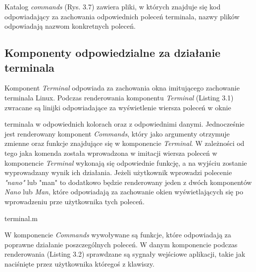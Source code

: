 \documentclass[10pt,a4paper]{report}
\begin{document}
\begin{adjustwidth}{2cm}{2cm}
\begin{adjustwidth}{0cm}{0cm}
\begin{minipage}{\linewidth}
\begin{center}
\end{center}
\end{minipage}
\begin{minipage}{\linewidth}
\vspace{0.3cm}
 Katalog \textit{commands} (Rys. 3.7) zawiera pliki, w których znajduje się kod odpowiadający za zachowania odpowiednich poleceń terminala, nazwy plików odpowiadają nazwom konkretnych poleceń.
 \end{minipage}
\end{adjustwidth}
\subsection{Komponenty odpowiedzialne za działanie terminala}
\begin{minipage}{1\linewidth}
Komponent \textit{Terminal} odpowiada za zachowania okna imitującego zachowanie terminala Linux. Podczas renderowania komponentu \textit{Terminal} (Listing 3.1) zwracane są linijki odpowiadające za wyświetlenie wiersza poleceń w oknie 
\end{minipage}
\begin{minipage}{1\linewidth}
terminala w odpowiednich kolorach oraz z odpowiednimi danymi. Jednocześnie jest renderowany komponent \textit{Commands}, który jako argumenty otrzymuje zmienne oraz funkcje znajdujące się w komponencie \textit{Terminal}. W zależności od  tego jaka komenda została wprowadzona w imitacji  wiersza poleceń w komponencie \textit{Terminal} wykonają się odpowiednie funkcję, a na wyjściu zostanie wyprowadzany wynik ich działania. Jeżeli użytkownik wprowadzi polecenie \textit{"nano"} lub "man" to dodatkowo będzie renderowany jeden z dwóch komponentów \textit{Nano} lub \textit{Man}, które odpowiadają za zachowanie okien wyświetlających się po wprowadzeniu prze użytkownika tych poleceń.
\end{minipage}
\begin{center}
\begin{lstinputlisting}[ escapeinside=``,caption={\textit{Renderowanie w komponencie Terminal}}]
{terminal.m}
\end{lstinputlisting}
\end{center}
\begin{minipage}{1\linewidth}
\vspace{0.2cm}
W komponencie \textit{Commands} wywoływane są funkcje, które odpowiadają za poprawne działanie poszczególnych poleceń. W danym komponencie podczas renderowania (Listing 3.2) sprawdzane są sygnały wejściowe aplikacji, takie jak naciśnięte przez użytkownika któregoś z klawiszy.

\end{minipage}
\end{adjustwidth}
\end{document}
